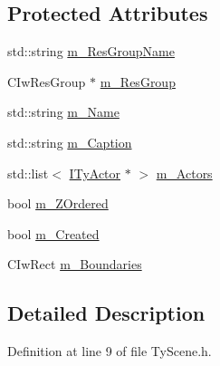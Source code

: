 \subsection*{Protected Attributes}
\begin{DoxyCompactItemize}
\item 
std::string \hyperlink{class_c_ty_scene_a6ea9f4376051cf9f0f7191e0bf5afad5}{m\_\-ResGroupName}
\item 
CIwResGroup $\ast$ \hyperlink{class_c_ty_scene_a6630f437b2907d89c8deb4a536483c00}{m\_\-ResGroup}
\item 
std::string \hyperlink{class_c_ty_scene_ad81b920909340266c2aba88805f7812a}{m\_\-Name}
\item 
std::string \hyperlink{class_c_ty_scene_a7ebea53f2e91d94f3f6ba6aef7a40f5b}{m\_\-Caption}
\item 
std::list$<$ \hyperlink{class_i_ty_actor}{ITyActor} $\ast$ $>$ \hyperlink{class_c_ty_scene_ac7780d185e2a7cbd5eeca02fe445fd96}{m\_\-Actors}
\item 
bool \hyperlink{class_c_ty_scene_aef04104af22b290a7207b45852be15c1}{m\_\-ZOrdered}
\item 
bool \hyperlink{class_c_ty_scene_a165009b2d0b79de7bcd4c0594931ec70}{m\_\-Created}
\item 
CIwRect \hyperlink{class_c_ty_scene_a5cbe320d312e3909c6ad4c32c99ed275}{m\_\-Boundaries}
\end{DoxyCompactItemize}


\subsection{Detailed Description}


Definition at line 9 of file TyScene.h.



